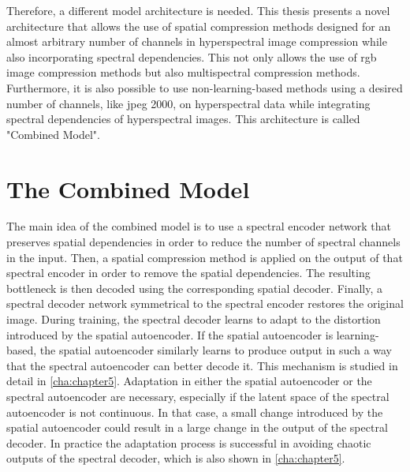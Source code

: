 Therefore, a different model architecture is needed. This thesis presents a novel architecture that allows the use of spatial compression methods designed for an almost arbitrary number of channels in hyperspectral image compression while also incorporating spectral dependencies. This not only allows the use of \ac{rgb} image compression methods but also multispectral compression methods. Furthermore, it is also possible to use non-learning-based methods using a desired number of channels, like \ac{jpeg} 2000, on hyperspectral data while integrating spectral dependencies of hyperspectral images. This architecture is called "Combined Model".
\section{The Combined Model\label{sec:combinedmodel}}
The main idea of the combined model is to use a spectral encoder network that preserves spatial dependencies in order to reduce the number of spectral channels in the input. Then, a spatial compression method is applied on the output of that spectral encoder in order to remove the spatial dependencies. The resulting bottleneck is then decoded using the corresponding spatial decoder. Finally, a spectral decoder network symmetrical to the spectral encoder restores the original image. During training, the spectral decoder learns to adapt to the distortion introduced by the spatial autoencoder. If the spatial autoencoder is learning-based, the spatial autoencoder similarly learns to produce output in such a way that the spectral autoencoder can better decode it. This mechanism is studied in detail in \autoref{cha:chapter5}. Adaptation in either the spatial autoencoder or the spectral autoencoder are necessary, especially if the latent space of the spectral autoencoder is not continuous. In that case, a small change introduced by the spatial autoencoder could result in a large change in the output of the spectral decoder. In practice the adaptation process is successful in avoiding chaotic outputs of the spectral decoder, which is also shown in \autoref{cha:chapter5}.

